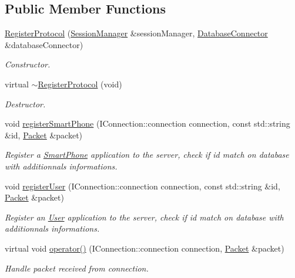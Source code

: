 \subsection*{Public Member Functions}
\begin{DoxyCompactItemize}
\item 
\hyperlink{class_register_protocol_aa9ef59e1cc96fe4ed579e52d34a90b8c}{Register\-Protocol} (\hyperlink{class_session_manager}{Session\-Manager} \&session\-Manager, \hyperlink{class_database_connector}{Database\-Connector} \&database\-Connector)
\begin{DoxyCompactList}\small\item\em Constructor. \end{DoxyCompactList}\item 
\hypertarget{class_register_protocol_a83e607d290459abdbeb63f2ee095ccbe}{virtual \hyperlink{class_register_protocol_a83e607d290459abdbeb63f2ee095ccbe}{$\sim$\-Register\-Protocol} (void)}\label{class_register_protocol_a83e607d290459abdbeb63f2ee095ccbe}

\begin{DoxyCompactList}\small\item\em Destructor. \end{DoxyCompactList}\item 
void \hyperlink{class_register_protocol_a5c8eaa376312f54aeb01705aaf22297a}{register\-Smart\-Phone} (I\-Connection\-::connection connection, const std\-::string \&id, \hyperlink{class_packet}{Packet} \&packet)
\begin{DoxyCompactList}\small\item\em Register a \hyperlink{struct_smart_phone}{Smart\-Phone} application to the server, check if id match on database with additionnals informations. \end{DoxyCompactList}\item 
void \hyperlink{class_register_protocol_aefffada19e90558fcfaa587b41105306}{register\-User} (I\-Connection\-::connection connection, const std\-::string \&id, \hyperlink{class_packet}{Packet} \&packet)
\begin{DoxyCompactList}\small\item\em Register an \hyperlink{struct_user}{User} application to the server, check if id match on database with additionnals informations. \end{DoxyCompactList}\item 
virtual void \hyperlink{class_register_protocol_a624eb1e0724960c8a352e77150ebdd7e}{operator()} (I\-Connection\-::connection connection, \hyperlink{class_packet}{Packet} \&packet)
\begin{DoxyCompactList}\small\item\em Handle packet received from connection. \end{DoxyCompactList}\end{DoxyCompactItemize}


